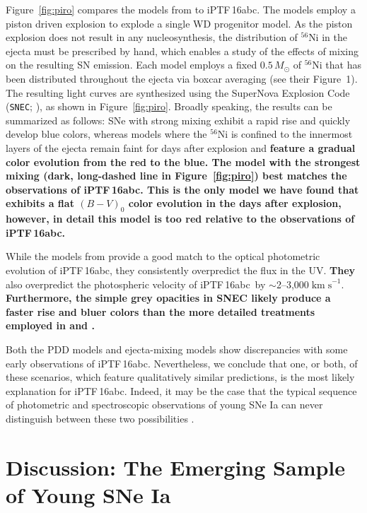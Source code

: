 \documentclass[twocolumn]{aastex61}
\newcommand{\sm}{M_\odot}
\newcommand{\abc}{iPTF\,16abc}
\newcommand{\sneia}{SNe Ia}
\begin{document}
Figure~\ref{fig:piro} compares the models from \citet{2016ApJ...826...96P} to
\abc. The \citeauthor{2016ApJ...826...96P} models employ a piston driven
explosion to explode a single WD progenitor model. As the piston explosion
does not result in any nucleosynthesis, the distribution of $^{56}$Ni in the
ejecta must be prescribed by hand, which enables a study of the effects of
mixing on the resulting SN emission. Each model employs a fixed $0.5\,\sm$ of
$^{56}$Ni that has been distributed throughout the ejecta via boxcar averaging
(see their Figure~1). The resulting light curves are synthesized using the
SuperNova Explosion Code (\texttt{SNEC}; \citealt{2015ApJ...814...63M}), as
shown in Figure~\ref{fig:piro}. Broadly speaking, the results can be
summarized as follows: SNe with strong mixing exhibit a rapid rise and quickly
develop blue colors, whereas models where the $^{56}$Ni is confined to the
innermost layers of the ejecta remain faint for days after explosion and
\textbf{feature a gradual color evolution from the red to the blue. The model
with the strongest mixing (dark, long-dashed line in Figure~\ref{fig:piro})
best matches the observations of \abc. This is the only model we have found
that exhibits a flat $(B-V)_0$ color evolution in the days after explosion,
however, in detail this model is too red relative to the observations of \abc.
}

While the models from \citet{2016ApJ...826...96P} provide a good match to the
optical photometric evolution of \abc, they consistently overpredict the flux
in the UV. \textbf{They} also overpredict the photospheric velocity of \abc\
by $\sim$2--3,000$\; \mathrm{km \; s}^{-1}$. \textbf{Furthermore, the simple
grey opacities in SNEC likely produce a faster rise and bluer colors than the
more detailed treatments employed in \citet{2014MNRAS.441..532D} and
\citet{2017MNRAS.472.2787N}.}

Both the PDD models and ejecta-mixing models show discrepancies with some
early observations of \abc. Nevertheless, we conclude that one, or both, of
these scenarios, which feature qualitatively similar predictions, is the most
likely explanation for \abc. Indeed, it may be the case that the typical
sequence of photometric and spectroscopic observations of young SNe Ia can
never distinguish between these two possibilities \citep{2017MNRAS.472.2787N}.

\section{\textbf{Discussion: The Emerging Sample of Young \sneia}}
\end{document}
